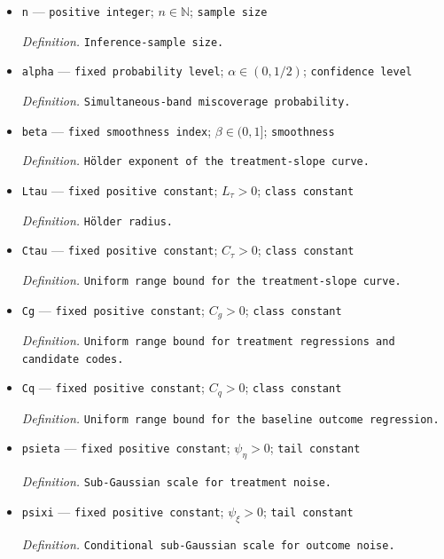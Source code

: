 \documentclass{article}
\begin{document}
\begin{itemize}
  \item \texttt{n} --- \texttt{positive integer}; \(n\in\mathbb N\); \texttt{sample size}
  \par\smallskip\noindent\emph{Definition.} \texttt{Inference-\allowbreak{}sample size.}
  \item \texttt{alpha} --- \texttt{fixed probability level}; \(\alpha\in(0,1/2)\); \texttt{confidence level}
  \par\smallskip\noindent\emph{Definition.} \texttt{Simultaneous-\allowbreak{}band miscoverage probability.}
  \item \texttt{beta} --- \texttt{fixed smoothness index}; \(\beta\in(0,1]\); \texttt{smoothness}
  \par\smallskip\noindent\emph{Definition.} \texttt{Hölder exponent of the treatment-\allowbreak{}slope curve.}
  \item \texttt{Ltau} --- \texttt{fixed positive constant}; \(L_{\tau}>0\); \texttt{class constant}
  \par\smallskip\noindent\emph{Definition.} \texttt{Hölder radius.}
  \item \texttt{Ctau} --- \texttt{fixed positive constant}; \(C_{\tau}>0\); \texttt{class constant}
  \par\smallskip\noindent\emph{Definition.} \texttt{Uniform range bound for the treatment-\allowbreak{}slope curve.}
  \item \texttt{Cg} --- \texttt{fixed positive constant}; \(C_g>0\); \texttt{class constant}
  \par\smallskip\noindent\emph{Definition.} \texttt{Uniform range bound for treatment regressions and candidate codes.}
  \item \texttt{Cq} --- \texttt{fixed positive constant}; \(C_q>0\); \texttt{class constant}
  \par\smallskip\noindent\emph{Definition.} \texttt{Uniform range bound for the baseline outcome regression.}
  \item \texttt{psieta} --- \texttt{fixed positive constant}; \(\psi_{\eta}>0\); \texttt{tail constant}
  \par\smallskip\noindent\emph{Definition.} \texttt{Sub-\allowbreak{}Gaussian scale for treatment noise.}
  \item \texttt{psixi} --- \texttt{fixed positive constant}; \(\psi_{\xi}>0\); \texttt{tail constant}
  \par\smallskip\noindent\emph{Definition.} \texttt{Conditional sub-\allowbreak{}Gaussian scale for outcome noise.}

\end{itemize}
\end{document}
